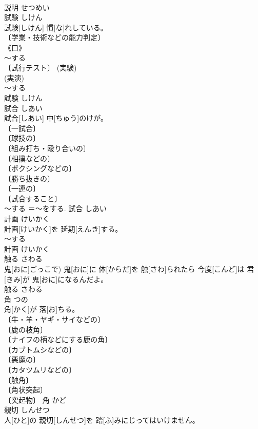 \documentclass[8pt]{extreport}
\begin{document}
\begin{CJK}{UTF8}{min}
\\	説明	せつめい	
\\	試験	しけん	
\\	試験[しけん] 慣[な]れしている。	
\\	〔学業・技術などの能力判定〕 
\\	《口》 
\\	～する 
\\	〔試行テスト〕 (実験) 
\\	(実演) 
\\	～する 
\\	試験	しけん	
\\	試合	しあい	
\\	試合[しあい] 中[ちゅう]のけが。	
\\	〔一試合〕 
\\	〔球技の〕 
\\	〔組み打ち・殴り合いの〕 
\\	〔相撲などの〕 
\\	〔ボクシングなどの〕 
\\	〔勝ち抜きの〕 
\\	〔一連の〕 
\\	〔試合すること〕 
\\	～する ＝～をする.	試合	しあい	
\\	計画	けいかく	
\\	計画[けいかく]を 延期[えんき]する。	
\\	～する 
\\	計画	けいかく	
\\	触る	さわる	
\\	鬼[おに]ごっこで) 鬼[おに]に 体[からだ]を 触[さわ]られたら 今度[こんど]は 君[きみ]が 鬼[おに]になるんだよ。	
\\	触る	さわる	
\\	角	つの	
\\	角[かく]が 落[お]ちる。	
\\	〔牛・羊・ヤギ・サイなどの〕 
\\	〔鹿の枝角〕 
\\	〔ナイフの柄などにする鹿の角〕 
\\	〔カブトムシなどの〕 
\\	〔悪魔の〕 
\\	〔カタツムリなどの〕 
\\	〔触角〕 
\\	〔角状突起〕 
\\	〔突起物〕	角	かど	
\\	親切	しんせつ	
\\	人[ひと]の 親切[しんせつ]を 踏[ふ]みにじってはいけません。	

\end{CJK}
\end{document}
